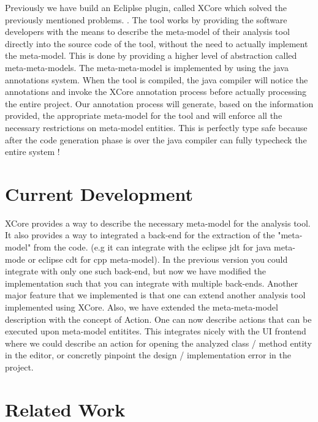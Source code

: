         Previously we have build an Ecliplse plugin, called XCore which solved the previously mentioned problems. \cite{oldThesis}. The tool works by providing the software developers with
the means to describe the meta-model of their analysis tool directly into the source code of the tool, without the need to actually implement the meta-model. This is done by providing a higher
level of abstraction called meta-meta-models. The meta-meta-model is implemented by using the java annotations system.\cite{oldThesis} \cite{book:ThinkingInJava} 
        When the tool is compiled, the java compiler will notice the annotations and invoke the XCore annotation process before actually processing the entire project. Our annotation process
will generate, based on the information provided, the appropriate meta-model for the tool and will enforce all the necessary restrictions on meta-model entities. This is perfectly type safe
because after the code generation phase is over the java compiler can fully typecheck the entire system !
        
\section{Current Development}
        
        XCore provides  a way to describe the necessary meta-model for the analysis tool. It also provides a way to integrated a back-end for the extraction of the "meta-model" from the code.
(e.g it can integrate with the eclipse jdt for java meta-mode or eclipse cdt for cpp meta-model). In the previous version you could integrate with only one such back-end, but now we have
modified the implementation such that you can integrate with multiple back-ends. 
        Another major feature that we implemented is that one can extend another analysis tool implemented using XCore.
        Also, we have extended the meta-meta-model description with the concept of Action. One can now describe actions that can be executed upon meta-model entitites. This integrates nicely
with the UI frontend where we could describe an action for opening the analyzed class / method entity in the editor, or concretly pinpoint the design / implementation error in the project.

\section{Related Work}
       

